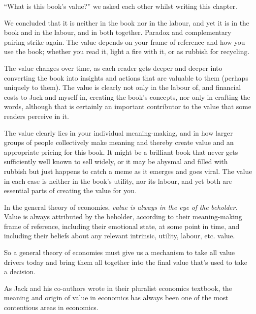 \begin{longstoryblock}
“What is this book’s value?” we asked each other whilst writing this chapter. 


We concluded that it is neither in the book nor in the labour, and yet it is in the book and in the labour, and in both together. Paradox and complementary pairing strike again. The value depends on your frame of reference and how you use the book; whether you read it, light a fire with it, or as rubbish for recycling. 


The value changes over time, as each reader gets deeper and deeper into converting the book into insights and actions that are valuable to them (perhaps uniquely to them). The value is clearly not only in the labour of, and financial costs to Jack and myself in, creating the book’s concepts, nor only in crafting the words, although that is certainly an important contributor to the value that some readers perceive in it.


The value clearly lies in your individual meaning-making, and in how larger groups of people collectively make meaning and thereby create value and an appropriate pricing for this book. It might be a brilliant book that never gets sufficiently well known to sell widely, or it may be abysmal and filled with rubbish but just happens to catch a meme as it emerges and goes viral. The value in each case is neither in the book’s utility, nor its labour, and yet both are essential parts of creating the value for you. 
\end{longstoryblock}


In the general theory of economies, \emph{value is always in the eye of the beholder}. Value is always attributed by the beholder, according to their meaning-making frame of reference, including their emotional state, at some point in time, and including their beliefs about any relevant intrinsic, utility, labour, etc. value. 


So a general theory of economies  must give us a mechanism to take all value drivers today\cite{mason-post-capitalism}  and bring them all together into the final value that’s used to take a decision.


As Jack and his co-authors wrote in their pluralist economics textbook\cite{reardon-introducing},  the meaning and origin of value in economics has always been one of the most contentious areas in economics.  


